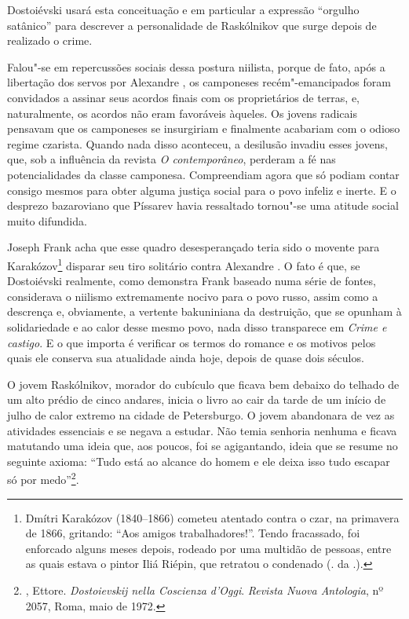 Dostoiévski usará esta conceituação e em particular a expressão
``orgulho satânico'' para descrever a personalidade de Raskólnikov que
surge depois de realizado o crime.

Falou"-se em repercussões sociais dessa postura niilista, porque de fato,
após a libertação dos servos por Alexandre , os camponeses
recém"-emancipados foram convidados a assinar seus acordos finais com os
proprietários de terras, e, naturalmente, os acordos não eram favoráveis
àqueles. Os jovens radicais pensavam que os camponeses se insurgiriam e
finalmente acabariam com o odioso regime czarista. Quando nada disso
aconteceu, a desilusão invadiu esses jovens, que, sob a influência da
revista \emph{O contemporâneo}, perderam a fé nas potencialidades da
classe camponesa. Compreendiam agora que só podiam contar consigo mesmos
para obter alguma justiça social para o povo infeliz e inerte. E o
desprezo bazaroviano que Píssarev havia ressaltado tornou"-se uma atitude
social muito difundida.

Joseph Frank acha que esse quadro desesperançado teria sido o movente
para Karakózov\footnote{Dmítri Karakózov (1840--1866) cometeu atentado
  contra o czar, na primavera de 1866, gritando: ``Aos amigos
  trabalhadores!''. Tendo fracassado, foi enforcado alguns meses depois,
  rodeado por uma multidão de pessoas, entre as quais estava o pintor
  Iliá Riépin, que retratou o condenado (. da .).} disparar seu tiro
solitário contra Alexandre . O fato é que, se Dostoiévski realmente,
como demonstra Frank baseado numa série de fontes, considerava o
niilismo extremamente nocivo para o povo russo, assim como a descrença
e, obviamente, a vertente bakuniniana da destruição, que se opunham à
solidariedade e ao calor desse mesmo povo, nada disso transparece em
\emph{Crime e castigo}. E o que importa é verificar os termos do romance
e os motivos pelos quais ele conserva sua atualidade ainda hoje, depois
de quase dois séculos.

O jovem Raskólnikov, morador do cubículo que ficava bem debaixo do
telhado de um alto prédio de cinco andares, inicia o livro ao cair da
tarde de um início de julho de calor extremo na cidade de Petersburgo. O
jovem abandonara de vez as atividades essenciais e se negava a estudar.
Não temia senhoria nenhuma e ficava matutando uma ideia que, aos poucos,
foi se agigantando, ideia que se resume no seguinte axioma: ``Tudo está
ao alcance do homem e ele deixa isso tudo escapar só por
medo''\footnote{, Ettore. \emph{Dostoievskij nella Coscienza
  d'Oggi}. \emph{Revista Nuova Antologia}, nº 2057, Roma, maio de 1972.}.

